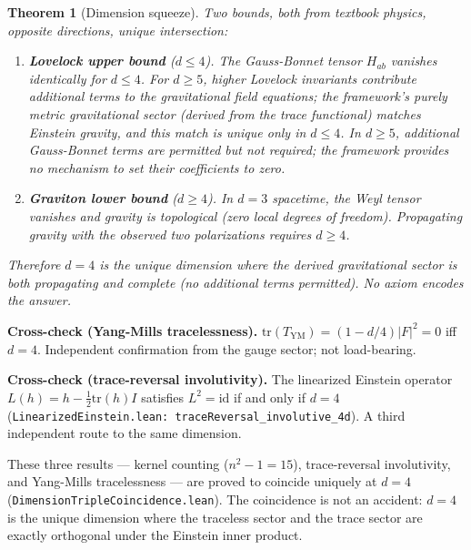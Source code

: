 \documentclass[11pt,letterpaper]{article}
\newtheorem{theorem}{Theorem}
\begin{document}
\begin{theorem}[Dimension squeeze]
\label{thm:dimension}
Two bounds, both from textbook physics, opposite directions, unique
intersection:
\begin{enumerate}[nosep]
  \item \textbf{Lovelock upper bound} ($d \leq 4$).
    The Gauss-Bonnet tensor $H_{ab}$ vanishes identically for
    $d \leq 4$.  For $d \geq 5$, higher Lovelock invariants
    contribute additional terms to the gravitational field equations;
    the framework's purely metric gravitational sector (derived from
    the trace functional) matches Einstein gravity, and this match
    is unique only in $d \leq 4$.  In $d \geq 5$, additional
    Gauss-Bonnet terms are permitted but not required; the framework
    provides no mechanism to set their coefficients to zero.
  \item \textbf{Graviton lower bound} ($d \geq 4$).
    In $d = 3$ spacetime, the Weyl tensor vanishes and gravity is
    topological (zero local degrees of freedom).  Propagating gravity
    with the observed two polarizations requires $d \geq 4$.
\end{enumerate}
Therefore $d = 4$ is the unique dimension where the derived
gravitational sector is both propagating and complete (no additional
terms permitted).  No axiom encodes the answer.
\end{theorem}

\noindent\textbf{Cross-check (Yang-Mills tracelessness).}
$\mathrm{tr}(T_{\mathrm{YM}}) = (1 - d/4)|F|^2 = 0$ iff $d = 4$.
Independent confirmation from the gauge sector; not load-bearing.

\noindent\textbf{Cross-check (trace-reversal involutivity).}
The linearized Einstein operator $L(h) = h - \tfrac{1}{2}\mathrm{tr}(h)I$
satisfies $L^2 = \mathrm{id}$ if and only if $d = 4$
(\texttt{LinearizedEinstein.lean: traceReversal\_involutive\_4d}).
A third independent route to the same dimension.

\noindent These three results --- kernel counting ($n^2 - 1 = 15$),
trace-reversal involutivity, and Yang-Mills tracelessness --- are
proved to coincide uniquely at $d = 4$
(\texttt{DimensionTripleCoincidence.lean}).  The coincidence is not
an accident: $d = 4$ is the unique dimension where the traceless
sector and the trace sector are exactly orthogonal under the
Einstein inner product.

\end{document}
